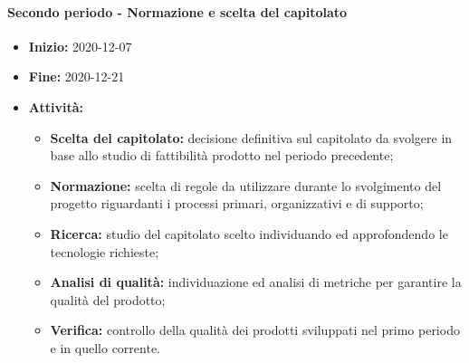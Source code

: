 \paragraph[Secondo periodo]{Secondo periodo - \textnormal{Normazione e scelta del capitolato}}
\begin{itemize}
    \item [] \textbf{Inizio:} 2020-12-07
    \item [] \textbf{Fine:} 2020-12-21
    \item [] \textbf{Attività:}
          \begin{itemize}
              \item \textbf{Scelta del capitolato:} decisione definitiva sul capitolato da svolgere in base allo studio di fattibilità prodotto nel periodo precedente;
              \item \textbf{Normazione:} scelta di regole da utilizzare durante lo svolgimento del progetto riguardanti i processi primari, organizzativi e di supporto;
              \item \textbf{Ricerca:} studio del capitolato scelto individuando ed approfondendo le tecnologie richieste;
              \item \textbf{Analisi di qualità:} individuazione ed analisi di metriche per garantire la qualità del prodotto;
              \item \textbf{Verifica:} controllo della qualità dei prodotti sviluppati nel primo periodo e in quello corrente.
          \end{itemize}
\end{itemize}

